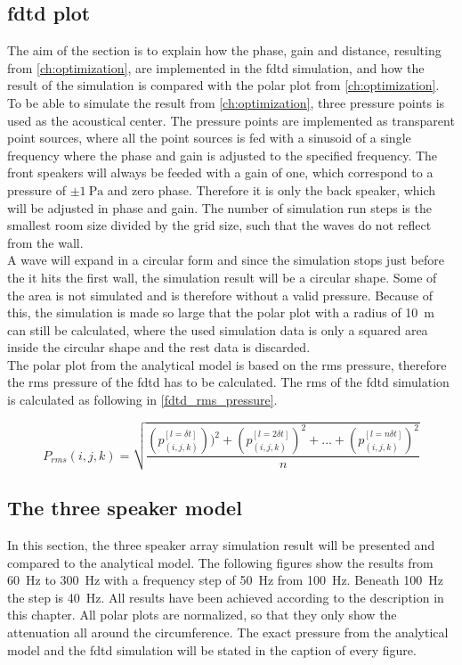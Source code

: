 \subsection{\gls{fdtd} plot}
The aim of the section is to explain how the phase, gain and distance, resulting from \autoref{ch:optimization}, are implemented in the \gls{fdtd} simulation, and how the result of the simulation is compared with the polar plot from \autoref{ch:optimization}. \\

To be able to simulate the result from \autoref{ch:optimization}, three pressure points is used as the acoustical center. The pressure points are implemented as transparent point sources, where all the point sources is fed with a sinusoid of a single frequency where the phase and gain is adjusted to the specified frequency. The front speakers will always be feeded with a gain of one, which correspond to a pressure of $\pm \SI{1}{\pascal}$ and zero phase. Therefore it is only the back speaker, which will be adjusted in phase and gain. The number of simulation run steps is the smallest room size divided by the grid size, such that the waves do not reflect from the wall. \\

A wave will expand in a circular form and since the simulation stops just before the it hits the first wall, the simulation result will be a circular shape. Some of the area is not simulated and is therefore without a valid pressure. Because of this, the simulation is made so large that the polar plot with a radius of \SI{10}{\meter} can still be calculated, where the used simulation data is only a squared area inside the circular shape and the rest data is discarded.\\

The polar plot from the analytical model is based on the \gls{rms} pressure, therefore the \gls{rms} pressure of the \gls{fdtd} has to be calculated. The \gls{rms} of the \gls{fdtd} simulation is calculated as following in \autoref{fdtd_rms_pressure}.

\begin{equation}\label{fdtd_rms_pressure}
P_{rms}(i,j,k)=\sqrt{\frac{\left(p_{(i,j,k)}^{[l= \delta t]} \right))^2 + \left(p_{(i,j,k)}^{[l= 2\delta t]}\right)^2 +...+\left(p_{(i,j,k)}^{[l= n\delta t]}\right)^2}{n}}
\end{equation}


\subsection{The three speaker model} \label{the_simulation_result}
In this section, the three speaker array simulation result will be presented and compared to the analytical model. The following figures show the results from \SI{60}{\hertz} to \SI{300}{\hertz} with a frequency step of \SI{50}{\hertz} from \SI{100}{\hertz}. Beneath \SI{100}{\hertz} the step is \SI{40}{\hertz}. All results have been achieved according to the description in this chapter. All polar plots are normalized, so that they only show the attenuation all around the circumference. The exact pressure from the analytical model and the \gls{fdtd} simulation will be stated in the caption of every figure. 



